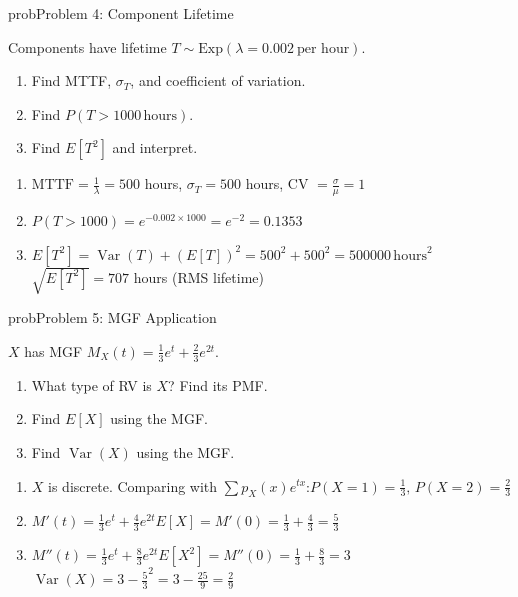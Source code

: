 \begin{PSbox}[unbreakable]{prob}{Problem 4: Component Lifetime}

Components have lifetime $T \sim \mathrm{Exp}(\lambda = 0.002\ \text{per hour})$.

\begin{enumerate}
\def\labelenumi{(\alph{enumi})}
\tightlist
\item
  Find MTTF, $\sigma_{T}$, and coefficient of variation.
\item
  Find $P(T > 1000\,\mathrm{hours})$.
\item
  Find $E[T^{2}]$ and interpret.
\end{enumerate}

\PSsolution{} 

\begin{enumerate}
\def\labelenumi{(\alph{enumi})}
\item
  $\mathrm{MTTF} = \frac{1}{\lambda} = 500$ hours, $\sigma_{T} = 500$ hours, CV $= \frac{\sigma}{\mu} = 1$
\item
  $P(T > 1000) = e^{-0.002 \times 1000} = e^{-2} = 0.1353$
\item
  $E[T^{2}] = \operatorname{Var}(T) + (E[T])^{2} = 500^{2} + 500^{2} = 500000\,\mathrm{hours}^{2}$\PSbr{}$\sqrt{E[T^{2}]} = 707$ hours (RMS lifetime)
\end{enumerate}

\end{PSbox}

\begin{PSbox}[unbreakable]{prob}{Problem 5: MGF Application}

$X$ has MGF $M_{X}(t) = \frac{1}{3}e^{t} + \frac{2}{3}e^{2t}$.

\begin{enumerate}
\def\labelenumi{(\alph{enumi})}
\tightlist
\item
  What type of RV is $X$? Find its PMF.
\item
  Find $E[X]$ using the MGF.
\item
  Find $\operatorname{Var}(X)$ using the MGF.
\end{enumerate}

\PSsolution{} 

\begin{enumerate}
\def\labelenumi{(\alph{enumi})}
\item
  $X$ is discrete. Comparing with $\sum p_{X}(x)e^{tx}$:\PSbr{}$\displaystyle P(X = 1) = \frac{1}{3},\, P(X = 2) = \frac{2}{3}$
\item
  $\displaystyle M'(t) = \frac{1}{3}e^{t} + \frac{4}{3}e^{2t}$\PSbr{}$\displaystyle E[X] = M'(0) = \frac{1}{3} + \frac{4}{3} = \frac{5}{3}$
\item
  $\displaystyle M''(t) = \frac{1}{3}e^{t} + \frac{8}{3}e^{2t}$\PSbr{}$\displaystyle E[X^{2}] = M''(0) = \frac{1}{3} + \frac{8}{3} = 3$\PSbr{}$\displaystyle \operatorname{Var}(X) = 3 - \frac{5}{3}^{2} = 3 - \frac{25}{9} = \frac{2}{9}$
\end{enumerate}

\end{PSbox}


